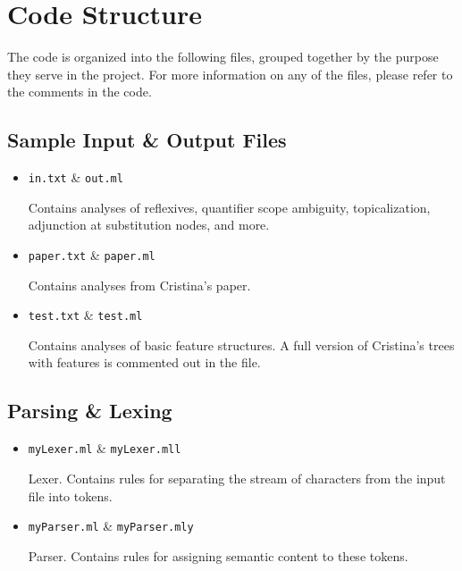 \documentclass[10.5pt]{article}
\newcommand{\code}[1]{\texttt{#1}}
\begin{document}
\section{Code Structure}
The code is organized into the following files, grouped together by the purpose they serve in the project. For more information on any of the files, please refer to the comments in the code.

\subsection{Sample Input \& Output Files}
\begin{itemize}
	\item \code{in.txt} \& \code{out.ml}
	
	Contains analyses of reflexives, quantifier scope ambiguity, topicalization, adjunction at substitution nodes, and more.
	\item \code{paper.txt} \& \code{paper.ml}
	
	Contains analyses from Cristina's paper.
	\item \code{test.txt} \& \code{test.ml}
	
	Contains analyses of basic feature structures. A full version of Cristina's trees with features is commented out in the file.
\end{itemize}

\subsection{Parsing \& Lexing}
\begin{itemize}
	\item \code{myLexer.ml} \& \code{myLexer.mll}
	
	Lexer. Contains rules for separating the stream of characters from the input file into tokens.
	\item \code{myParser.ml} \& \code{myParser.mly}
	
	Parser. Contains rules for assigning semantic content to these tokens.
\end{itemize}
\end{document}
